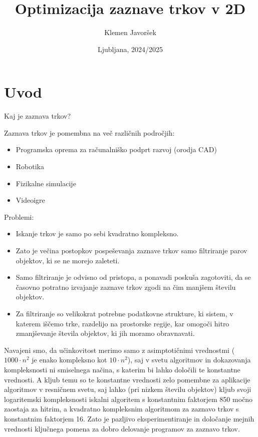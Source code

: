 \documentclass[a4paper,12pt]{article}
\begin{document}
\begin{titlepage}
    \title{\Huge Optimizacija zaznave trkov v 2D}
    \author{Klemen Javoršek}
    \date{Ljubljana, 2024/2025}
    \maketitle
    \renewcommand{\headrulewidth}{0cm}
    \fancyhf{}
    \thispagestyle{fancy}
\end{titlepage}

\newpage
\quad
\thispagestyle{empty}
\newpage
\tableofcontents
\newpage
\section{Uvod}
Kaj je zaznava trkov?

Zaznava trkov je pomembna na več različnih področjih:
\begin{itemize}
    \item Programska oprema za računalniško podprt razvoj (orodja CAD)
    \item Robotika
    \item Fizikalne simulacije
    \item Videoigre
\end{itemize}
Problemi:
\begin{itemize}
    \item Iskanje trkov je samo po sebi kvadratno kompleksno.
    \item Zato je večina postopkov pospeševanja zaznave trkov samo filtriranje parov objektov, ki se ne morejo zaleteti.
    \item Samo filtriranje je odvisno od pristopa, a ponavadi poskuša zagotoviti, da se časovno potratno izvajanje zaznave trkov zgodi na čim manjšem številu objektov.
    \item Za filtriranje so velikokrat potrebne podatkovne strukture, ki sistem, v katerem iščemo trke, razdelijo na prostorske regije, kar omogoči hitro zmanjševanje števila objektov, ki jih moramo obravnavati.
\end{itemize}


Navajeni smo, da učinkovitost merimo samo z asimptotičnimi vrednostmi ($1000 \cdot n^2$ je enako
kompleksno kot $10 \cdot n^2$), saj v svetu algoritmov in dokazovanja kompleksnosti ni smiselnega načina,
s katerim bi lahko določili te konstantne vrednosti.
A kljub temu so te konstantne vrednosti zelo pomembne za aplikacije algoritmov v resničnem svetu,
saj lahko (pri nizkem številu objektov) kljub svoji logaritemski kompleksnosti iskalni algoritem
s konstantnim faktorjem 850 močno zaostaja za hitrim, a kvadratno kompleksnim algoritmom za zaznavo
trkov s konstantnim faktorjem 16. Zato je pazljivo eksperimentiranje in določanje mejnih vrednosti ključnega
pomena za dobro delovanje programov za zaznavo trkov.
\end{document}

